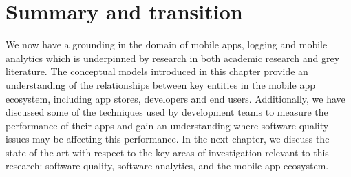 \section{Summary and transition}
We now have a grounding in the domain of mobile apps, logging and mobile analytics which is underpinned by research in both academic research and grey literature. The conceptual models introduced in this chapter provide an understanding of the relationships between key entities in the mobile app ecosystem, including app stores, developers and end users.  Additionally, we have discussed some of the techniques used by development teams to measure the performance of their apps and gain an understanding where software quality issues may be affecting this performance. In the next chapter, we discuss the state of the art with respect to the key areas of investigation relevant to this research: software quality, software analytics, and the mobile app ecosystem. 